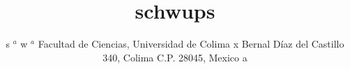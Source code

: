 \documentclass[11pt]{article}
\begin{document}
  
    \author{ 
  s \currentcolumn{} $^a$
  w \currentcolumn{} \normalsize{$^a$ Facultad de Ciencias, Universidad de Colima}
  x \currentcolumn{} \vspace{0.3cm}
\normalsize{Bernal D\'iaz del Castillo 340, Colima C.P. 28045, Mexico} 
  a \currentcolumn{} }

    \title{schwups}

    \maketitle
 
\end{document}
